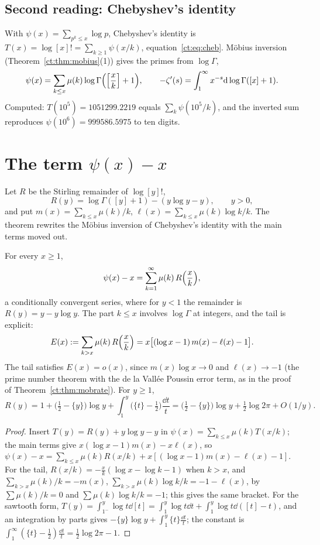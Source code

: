 \subsection*{Second reading: Chebyshev's identity}
With $\psi(x)=\sum_{p^k\le x}\log p$, Chebyshev's identity is $T(x)=\log[x]!=\sum_{k\ge1}\psi(x/k)$, equation~\eqref{ct:eq:cheb}. Möbius inversion (Theorem~\ref{ct:thm:mobius}(1)) gives the primes from $\log\Gamma$,
\[
\psi(x)=\sum_{k\le x}\mu(k)\log\Gamma\Bigl(\Bigl[\frac xk\Bigr]+1\Bigr),\qquad-\zeta'(s)=\int_1^\infty x^{-s}\mathrm{d}\log\Gamma([x]+1).
\]
Computed: $T(10^5)=1051299.2219$ equals $\sum_k\psi(10^5/k)$, and the inverted sum reproduces $\psi(10^6)=999586.5975$ to ten digits.

\section{The term $\psi(x)-x$}\label{lg:sec:psi}
Let $R$ be the Stirling remainder of $\log[y]!$,
\[
R(y)=\log\Gamma([y]+1)-(y\log y-y),\qquad y>0,
\]
and put $m(x)=\sum_{k\le x}\mu(k)/k$, $\ell(x)=\sum_{k\le x}\mu(k)\log k/k$. The theorem rewrites the Möbius inversion of Chebyshev's identity with the main terms moved out.
\begin{theorem}\label{lg:thm:psi}
For every $x\ge1$,
\[
\psi(x)-x=\sum_{k=1}^\infty\mu(k)\,R\Bigl(\frac xk\Bigr),
\]
a conditionally convergent series, where for $y<1$ the remainder is $R(y)=y-y\log y$. The part $k\le x$ involves $\log\Gamma$ at integers, and the tail is explicit:
\[
E(x):=\sum_{k>x}\mu(k)\,R\Bigl(\frac xk\Bigr)=x\bigl[(\log x-1)\,m(x)-\ell(x)-1\bigr].
\]
The tail satisfies $E(x)=o(x)$, since $m(x)\log x\to0$ and $\ell(x)\to-1$ (the prime number theorem with the de la Vallée Poussin error term, as in the proof of Theorem~\ref{ct:thm:mobrate}). For $y\ge1$,
\[
R(y)=1+\bigl(\tfrac12-\{y\}\bigr)\log y+\int_1^y\bigl(\{t\}-\tfrac12\bigr)\frac{\dd t}t=\bigl(\tfrac12-\{y\}\bigr)\log y+\tfrac12\log2\pi+O(1/y).
\]
\end{theorem}
\begin{proof}
Insert $T(y)=R(y)+y\log y-y$ in $\psi(x)=\sum_{k\le x}\mu(k)T(x/k)$; the main terms give $x(\log x-1)m(x)-x\ell(x)$, so $\psi(x)-x=\sum_{k\le x}\mu(k)R(x/k)+x[(\log x-1)m(x)-\ell(x)-1]$. For the tail, $R(x/k)=-\frac xk(\log x-\log k-1)$ when $k>x$, and $\sum_{k>x}\mu(k)/k=-m(x)$, $\sum_{k>x}\mu(k)\log k/k=-1-\ell(x)$, by $\sum\mu(k)/k=0$ and $\sum\mu(k)\log k/k=-1$; this gives the same bracket. For the sawtooth form, $T(y)=\int_{1^-}^y\log t\dd[t]=\int_1^y\log t\dd t+\int_1^y\log t\dd([t]-t)$, and an integration by parts gives $-\{y\}\log y+\int_1^y\{t\}\frac{\dd t}t$; the constant is $\int_1^\infty(\{t\}-\frac12)\frac{\dd t}t=\frac12\log2\pi-1$.
\end{proof}
